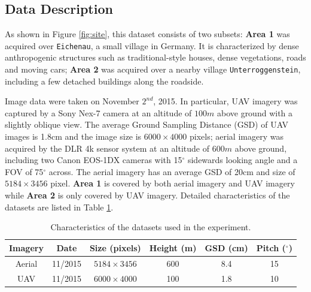 \subsection{Data Description}
As shown in Figure \ref{fig:site}, this dataset consists of two subsets: \textbf{Area 1} was acquired over \texttt{Eichenau}, a small village in Germany. It is characterized by dense anthropogenic structures such as traditional-style houses, dense vegetations, roads and moving cars; \textbf{Area 2} was acquired over a nearby village \texttt{Unterroggenstein}, including a few detached buildings along the roadside. 

Image data were taken on November $2^{nd}$, 2015. In particular, UAV imagery was captured by a Sony Nex-7 camera at an altitude of $100m$ above ground with a slightly oblique view. The average Ground Sampling Distance (GSD) of UAV images is 1.8cm and the image size is $6000 \times 4000$ pixels; aerial imagery was acquired by the DLR 4k sensor system \cite{kurz2014performance} at an altitude of $600m$ above ground, including two Canon EOS-1DX cameras with 15$^\circ$ sidewards looking angle and a FOV of 75$^\circ$ across. The aerial imagery has an average GSD of 20cm and size of $5184 \times 3456$ pixel. \textbf{Area 1} is covered by both aerial imagery and UAV imagery while \textbf{Area 2} is only covered by UAV imagery. 
Detailed characteristics of the datasets are listed in Table \ref{tab:dataset}.
\begin{table}[htb]
\centering
\begin{tabular}{cccccc}
\toprule
Imagery  & Date & Size (pixels) & Height (m) & GSD (cm) & Pitch ($^{\circ}$) \\
\midrule
Aerial  & 11/2015 & $5184 \times 3456$ & 600 & 8.4 & 15 \\
UAV     & 11/2015 & $6000 \times 4000$ & 100 & 1.8 & 10\\
\bottomrule
\end{tabular}
\caption{Characteristics of the datasets used in the experiment.}
\label{tab:dataset}
\end{table}

